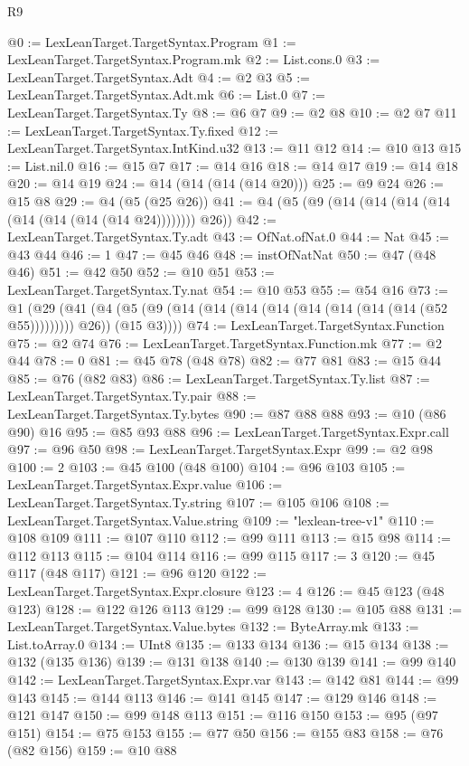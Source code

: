 \begin{lexlean}{R9}
\begin{coremodule}
@0 := LexLeanTarget.TargetSyntax.Program
@1 := LexLeanTarget.TargetSyntax.Program.mk
@2 := List.cons.{0}
@3 := LexLeanTarget.TargetSyntax.Adt
@4 := @2 @3
@5 := LexLeanTarget.TargetSyntax.Adt.mk
@6 := List.{0}
@7 := LexLeanTarget.TargetSyntax.Ty
@8 := @6 @7
@9 := @2 @8
@10 := @2 @7
@11 := LexLeanTarget.TargetSyntax.Ty.fixed
@12 := LexLeanTarget.TargetSyntax.IntKind.u32
@13 := @11 @12
@14 := @10 @13
@15 := List.nil.{0}
@16 := @15 @7
@17 := @14 @16
@18 := @14 @17
@19 := @14 @18
@20 := @14 @19
@24 := @14 (@14 (@14 (@14 @20)))
@25 := @9 @24
@26 := @15 @8
@29 := @4 (@5 (@25 @26))
@41 := @4 (@5 (@9 (@14 (@14 (@14 (@14 (@14 (@14 (@14 (@14 @24)))))))) @26))
@42 := LexLeanTarget.TargetSyntax.Ty.adt
@43 := OfNat.ofNat.{0}
@44 := Nat
@45 := @43 @44
@46 := 1
@47 := @45 @46
@48 := instOfNatNat
@50 := @47 (@48 @46)
@51 := @42 @50
@52 := @10 @51
@53 := LexLeanTarget.TargetSyntax.Ty.nat
@54 := @10 @53
@55 := @54 @16
@73 := @1
    (@29
      (@41 (@4 (@5 (@9 (@14 (@14 (@14 (@14 (@14 (@14 (@14 (@14 (@52 @55))))))))) @26)) (@15 @3))))
@74 := LexLeanTarget.TargetSyntax.Function
@75 := @2 @74
@76 := LexLeanTarget.TargetSyntax.Function.mk
@77 := @2 @44
@78 := 0
@81 := @45 @78 (@48 @78)
@82 := @77 @81
@83 := @15 @44
@85 := @76 (@82 @83)
@86 := LexLeanTarget.TargetSyntax.Ty.list
@87 := LexLeanTarget.TargetSyntax.Ty.pair
@88 := LexLeanTarget.TargetSyntax.Ty.bytes
@90 := @87 @88 @88
@93 := @10 (@86 @90) @16
@95 := @85 @93 @88
@96 := LexLeanTarget.TargetSyntax.Expr.call
@97 := @96 @50
@98 := LexLeanTarget.TargetSyntax.Expr
@99 := @2 @98
@100 := 2
@103 := @45 @100 (@48 @100)
@104 := @96 @103
@105 := LexLeanTarget.TargetSyntax.Expr.value
@106 := LexLeanTarget.TargetSyntax.Ty.string
@107 := @105 @106
@108 := LexLeanTarget.TargetSyntax.Value.string
@109 := "lexlean-tree-v1"
@110 := @108 @109
@111 := @107 @110
@112 := @99 @111
@113 := @15 @98
@114 := @112 @113
@115 := @104 @114
@116 := @99 @115
@117 := 3
@120 := @45 @117 (@48 @117)
@121 := @96 @120
@122 := LexLeanTarget.TargetSyntax.Expr.closure
@123 := 4
@126 := @45 @123 (@48 @123)
@128 := @122 @126 @113
@129 := @99 @128
@130 := @105 @88
@131 := LexLeanTarget.TargetSyntax.Value.bytes
@132 := ByteArray.mk
@133 := List.toArray.{0}
@134 := UInt8
@135 := @133 @134
@136 := @15 @134
@138 := @132 (@135 @136)
@139 := @131 @138
@140 := @130 @139
@141 := @99 @140
@142 := LexLeanTarget.TargetSyntax.Expr.var
@143 := @142 @81
@144 := @99 @143
@145 := @144 @113
@146 := @141 @145
@147 := @129 @146
@148 := @121 @147
@150 := @99 @148 @113
@151 := @116 @150
@153 := @95 (@97 @151)
@154 := @75 @153
@155 := @77 @50
@156 := @155 @83
@158 := @76 (@82 @156)
@159 := @10 @88

\end{coremodule}
\end{lexlean}
